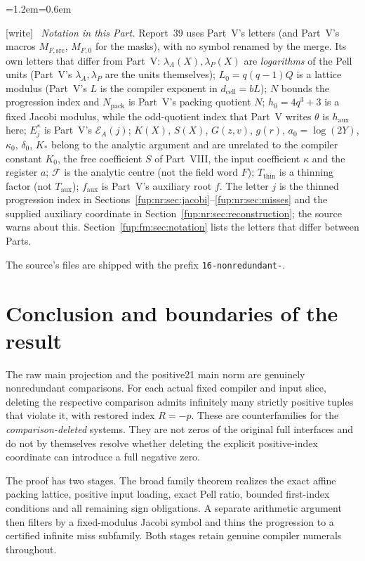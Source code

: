 \documentclass[11pt,letterpaper]{article}
\theoremstyle{definition}\newtheorem{definition}[theorem]{Definition}
\theoremstyle{remark}\newtheorem{remark}[theorem]{Remark}
\newcommand{\dcell}{d_{\mathrm{cell}}}
\newcommand{\MFsrcV}{M_{F,\mathrm{src}}}
\newcommand{\MFnatV}{M_{F,0}}
\newcommand{\Taux}{T_{\mathrm{aux}}}\newcommand{\yaux}{y_{\mathrm{aux}}}
\newcommand{\faux}{f_{\mathrm{aux}}}\newcommand{\rmain}{r_{\mathrm{main}}}\newcommand{\acent}{\mathcal F}
\newcommand{\wtag}{\textup{[write]}}
\newenvironment{writenote}{\par\smallskip\begin{list}{}{\leftmargin=1.2em\rightmargin=0.6em}\item[]\small\wtag\ }{\end{list}\smallskip}
\begin{document}
\begin{writenote}
\emph{Notation in this Part.} Report~39 uses Part~V's letters (and Part~V's macros $\MFsrcV$, $\MFnatV$ for the masks), with no symbol renamed by the merge. Its own letters that differ from Part~V: $\lambda_A(X),\lambda_P(X)$ are \emph{logarithms} of the Pell units (Part~V's $\lambda_A,\lambda_P$ are the units themselves); $L_0=q(q-1)Q$ is a lattice modulus (Part~V's $L$ is the compiler exponent in $\dcell=bL$); $N$ bounds the progression index and $N_{\mathrm{pack}}$ is Part~V's packing quotient $N$; $h_0=4q^3+3$ is a fixed Jacobi modulus, while the odd-quotient index that Part~V writes $\theta$ is $h_{\mathrm{aux}}$ here; $E^*_j$ is Part~V's $\mathcal E_A(j)$; $K(X)$, $S(X)$, $G(z,v)$, $g(r)$, $a_0=\log(2Y)$, $\kappa_0$, $\delta_0$, $K_*$ belong to the analytic argument and are unrelated to the compiler constant $K_0$, the free coefficient $S$ of Part~VIII, the input coefficient $\kappa$ and the register $a$; $\acent$ is the analytic centre (not the field word $F$); $T_{\mathrm{thin}}$ is a thinning factor (not $\Taux$); $\faux$ is Part~V's auxiliary root $f$. The letter $j$ is the thinned progression index in Sections~\ref{fup:nr:sec:jacobi}--\ref{fup:nr:sec:misses} and the supplied auxiliary coordinate in Section~\ref{fup:nr:sec:reconstruction}; the source warns about this. Section~\ref{fup:fm:sec:notation} lists the letters that differ between Parts.

The source's files are shipped with the prefix \texttt{16-nonredundant-}.
\end{writenote}

\section{Conclusion and boundaries of the result}\label{fup:nr:sec:scope}
The raw main projection and the positive21 main norm are genuinely nonredundant comparisons. For each actual fixed compiler and input slice, deleting the respective comparison admits infinitely many strictly positive tuples that violate it, with restored index $R=-p$. These are counterfamilies for the \emph{comparison-deleted} systems. They are not zeros of the original full interfaces and do not by themselves resolve whether deleting the explicit positive-index coordinate can introduce a full negative zero.

The proof has two stages. The broad family theorem realizes the exact affine packing lattice, positive input loading, exact Pell ratio, bounded first-index conditions and all remaining sign obligations. A separate arithmetic argument then filters by a fixed-modulus Jacobi symbol and thins the progression to a certified infinite miss subfamily. Both stages retain genuine compiler numerals throughout.
\end{document}
